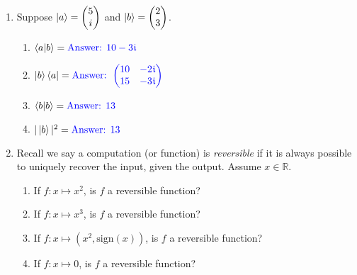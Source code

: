 \documentclass[12pt]{article}
\begin{document}
\begin{enumerate}[font=\bfseries]
    \item {} Suppose $\ket{a} = \begin{pmatrix}5 \\ i \end{pmatrix}$ and $\ket{b} = \begin{pmatrix}2 \\ 3 \end{pmatrix}$.
    \begin{enumerate}[label=\theenumi.\arabic*]
        \item $\braket{a|b} = {\color{blue}\mbox{Answer: }10-3\kern 0.5pt\mathfrak{i}}$ 
        \item $\ket{b}\bra{a} = \Ans{\SQBG{\relax}{10}{-2\NiceI}{15}{-3\NiceI}}$
        \item $\braket{b|b} = {\color{blue}\mbox{Answer: }13}$ 
        \item $|\ket{b}|^2 = {\color{blue}\mbox{Answer: }13}$ 
    \end{enumerate}
        \item {} Recall we say a computation (or function) is \emph{reversible} if it is always possible to uniquely recover the input, given the output. Assume $x \in \mathbb{R}$.
    \begin{enumerate}[label=\theenumi.\arabic*]
        \item If $f : x \mapsto x^2$, is $f$ a reversible function? 
        \item If $f : x \mapsto x^3$, is $f$ a reversible function? 
        \item If $f : x \mapsto (x^2,\textrm{sign}(x))$, is $f$ a reversible function? 
        \item If $f : x \mapsto 0$, is $f$ a reversible function? 
    \end{enumerate}
 
    
\end{enumerate}
\end{document}
